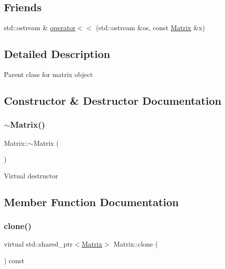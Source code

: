 \subsection*{Friends}
\begin{DoxyCompactItemize}
\item 
std\+::ostream \& \mbox{\hyperlink{class_matrix_afb54f4bb75b4cc6f7d2008d454208a02}{operator$<$$<$}} (std\+::ostream \&os, const \mbox{\hyperlink{class_matrix}{Matrix}} \&x)
\end{DoxyCompactItemize}


\subsection{Detailed Description}
Parent class for matrix object 

\subsection{Constructor \& Destructor Documentation}
\mbox{\label{class_matrix_a9b1c3627f573d78a2f08623fdfef990f}} 
\subsubsection{\texorpdfstring{$\sim$Matrix()}{~Matrix()}}
{\footnotesize\ttfamily Matrix\+::$\sim$\+Matrix (\begin{DoxyParamCaption}{ }\end{DoxyParamCaption})\hspace{0.3cm}{\ttfamily [virtual]}}

Virtual destructor 

\subsection{Member Function Documentation}
\mbox{\label{class_matrix_aae61e88849e7c16bc9fabf0ad5bd20f0}} 
\subsubsection{\texorpdfstring{clone()}{clone()}}
{\footnotesize\ttfamily virtual std\+::shared\+\_\+ptr$<$\mbox{\hyperlink{class_matrix}{Matrix}}$>$ Matrix\+::clone (\begin{DoxyParamCaption}{ }\end{DoxyParamCaption}) const\hspace{0.3cm}{\ttfamily [pure virtual]}}

